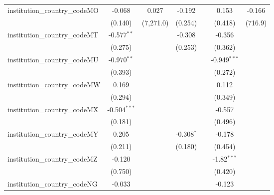 \begin{tabular}{lcccccc}
   institution\_country\_codeMO          & -0.068         & 0.027         & -0.192         &                & 0.153          & -0.166\\   
                                         & (0.140)        & (7,271.0)     & (0.254)        &                & (0.418)        & (716.9)\\   
   institution\_country\_codeMT          & -0.577$^{**}$  &               & -0.308         &                & -0.356         &   \\   
                                         & (0.275)        &               & (0.253)        &                & (0.362)        &   \\   
   institution\_country\_codeMU          & -0.970$^{**}$  &               &                &                & -0.949$^{***}$ &   \\   
                                         & (0.393)        &               &                &                & (0.272)        &   \\   
   institution\_country\_codeMW          & 0.169          &               &                &                & 0.112          &   \\   
                                         & (0.294)        &               &                &                & (0.349)        &   \\   
   institution\_country\_codeMX          & -0.504$^{***}$ &               &                &                & -0.557         &   \\   
                                         & (0.181)        &               &                &                & (0.496)        &   \\   
   institution\_country\_codeMY          & 0.205          &               & -0.308$^{*}$   &                & -0.178         &   \\   
                                         & (0.211)        &               & (0.180)        &                & (0.454)        &   \\   
   institution\_country\_codeMZ          & -0.120         &               &                &                & -1.82$^{***}$  &   \\   
                                         & (0.750)        &               &                &                & (0.420)        &   \\   
   institution\_country\_codeNG          & -0.033         &               &                &                & -0.123         &   \\   

\end{tabular}
